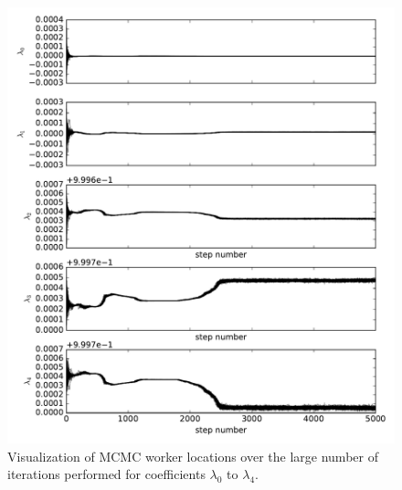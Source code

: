 \begin{figure}[ht]
  \includegraphics[width=\textwidth]{img/line-time-1.pdf}
  \caption{Visualization of MCMC worker locations over the large number of iterations performed for coefficients $\lambda_0 $ to $\lambda_4$. }
  \label{fig:MCMC_time}
\end{figure}

